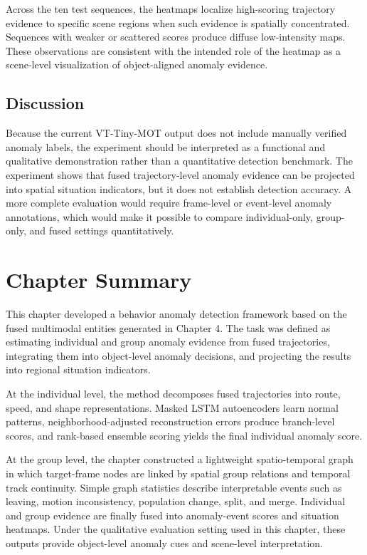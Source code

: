 Across the ten test sequences, the heatmaps localize high-scoring trajectory evidence to specific scene regions when such evidence is spatially concentrated. Sequences with weaker or scattered scores produce diffuse low-intensity maps. These observations are consistent with the intended role of the heatmap as a scene-level visualization of object-aligned anomaly evidence.

\subsection{Discussion}
Because the current VT-Tiny-MOT output does not include manually verified anomaly labels, the experiment should be interpreted as a functional and qualitative demonstration rather than a quantitative detection benchmark. The experiment shows that fused trajectory-level anomaly evidence can be projected into spatial situation indicators, but it does not establish detection accuracy. A more complete evaluation would require frame-level or event-level anomaly annotations, which would make it possible to compare individual-only, group-only, and fused settings quantitatively.

\section{Chapter Summary}
This chapter developed a behavior anomaly detection framework based on the fused multimodal entities generated in Chapter 4. The task was defined as estimating individual and group anomaly evidence from fused trajectories, integrating them into object-level anomaly decisions, and projecting the results into regional situation indicators.

At the individual level, the method decomposes fused trajectories into route, speed, and shape representations. Masked LSTM autoencoders learn normal patterns, neighborhood-adjusted reconstruction errors produce branch-level scores, and rank-based ensemble scoring yields the final individual anomaly score.

At the group level, the chapter constructed a lightweight spatio-temporal graph in which target-frame nodes are linked by spatial group relations and temporal track continuity. Simple graph statistics describe interpretable events such as leaving, motion inconsistency, population change, split, and merge. Individual and group evidence are finally fused into anomaly-event scores and situation heatmaps. Under the qualitative evaluation setting used in this chapter, these outputs provide object-level anomaly cues and scene-level interpretation.
